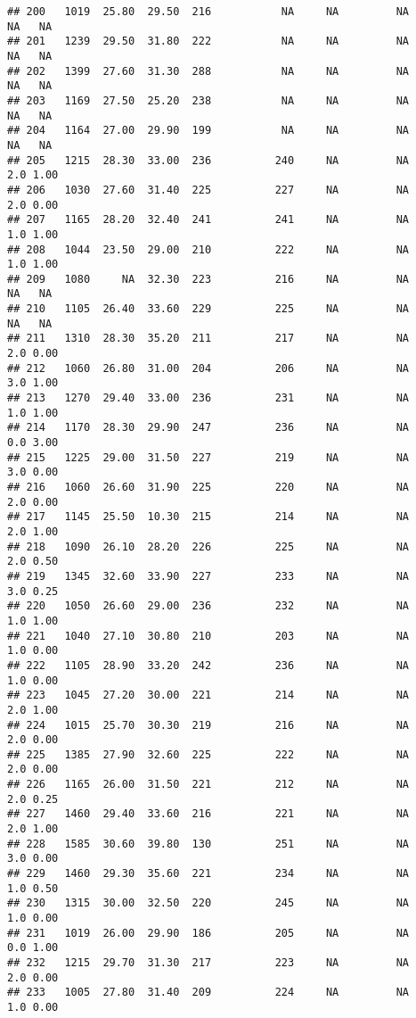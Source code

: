\documentclass[
]{article}
\begin{document}
\begin{verbatim}
## 200   1019  25.80  29.50  216           NA     NA         NA      NA   NA
## 201   1239  29.50  31.80  222           NA     NA         NA      NA   NA
## 202   1399  27.60  31.30  288           NA     NA         NA      NA   NA
## 203   1169  27.50  25.20  238           NA     NA         NA      NA   NA
## 204   1164  27.00  29.90  199           NA     NA         NA      NA   NA
## 205   1215  28.30  33.00  236          240     NA         NA     2.0 1.00
## 206   1030  27.60  31.40  225          227     NA         NA     2.0 0.00
## 207   1165  28.20  32.40  241          241     NA         NA     1.0 1.00
## 208   1044  23.50  29.00  210          222     NA         NA     1.0 1.00
## 209   1080     NA  32.30  223          216     NA         NA      NA   NA
## 210   1105  26.40  33.60  229          225     NA         NA      NA   NA
## 211   1310  28.30  35.20  211          217     NA         NA     2.0 0.00
## 212   1060  26.80  31.00  204          206     NA         NA     3.0 1.00
## 213   1270  29.40  33.00  236          231     NA         NA     1.0 1.00
## 214   1170  28.30  29.90  247          236     NA         NA     0.0 3.00
## 215   1225  29.00  31.50  227          219     NA         NA     3.0 0.00
## 216   1060  26.60  31.90  225          220     NA         NA     2.0 0.00
## 217   1145  25.50  10.30  215          214     NA         NA     2.0 1.00
## 218   1090  26.10  28.20  226          225     NA         NA     2.0 0.50
## 219   1345  32.60  33.90  227          233     NA         NA     3.0 0.25
## 220   1050  26.60  29.00  236          232     NA         NA     1.0 1.00
## 221   1040  27.10  30.80  210          203     NA         NA     1.0 0.00
## 222   1105  28.90  33.20  242          236     NA         NA     1.0 0.00
## 223   1045  27.20  30.00  221          214     NA         NA     2.0 1.00
## 224   1015  25.70  30.30  219          216     NA         NA     2.0 0.00
## 225   1385  27.90  32.60  225          222     NA         NA     2.0 0.00
## 226   1165  26.00  31.50  221          212     NA         NA     2.0 0.25
## 227   1460  29.40  33.60  216          221     NA         NA     2.0 1.00
## 228   1585  30.60  39.80  130          251     NA         NA     3.0 0.00
## 229   1460  29.30  35.60  221          234     NA         NA     1.0 0.50
## 230   1315  30.00  32.50  220          245     NA         NA     1.0 0.00
## 231   1019  26.00  29.90  186          205     NA         NA     0.0 1.00
## 232   1215  29.70  31.30  217          223     NA         NA     2.0 0.00
## 233   1005  27.80  31.40  209          224     NA         NA     1.0 0.00

\end{verbatim}
\end{document}
